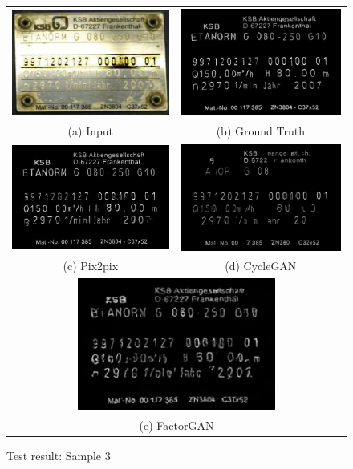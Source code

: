	
\begin{figure}[H]
\begin{tabular}{cc}
\includegraphics[width=65mm]{images/i4.jpg} &   \includegraphics[width=65mm]{images/g4.jpg} \\
(a) Input & (b) Ground Truth \\[6pt]
 \includegraphics[width=65mm]{images/p4.jpg} &   \includegraphics[width=65mm]{images/c4.jpg} \\
(c) Pix2pix & (d) CycleGAN \\[6pt]
\multicolumn{2}{c}{\includegraphics[width=65mm]{images/f4.jpg} }\\
\multicolumn{2}{c}{(e) FactorGAN}
\end{tabular}
\caption{Test result: Sample 3}
\label{test3}
\end{figure}

